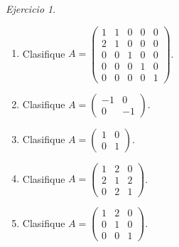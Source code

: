 \documentclass[12pt]{article}
\theoremstyle{remark}
\newtheorem{Ejer}[definicion]{Ejercicio}
\begin{document}
\begin{Ejer}
\begin{enumerate}[resume=banco]
\item Clasifique $A=\begin{pmatrix}1&1&0&0&0\\2&1&0&0&0\\0&0&1&0&0\\0&0&0&1&0\\0&0&0&0&1\end{pmatrix}$.

\item Clasifique $A=\begin{pmatrix}-1&0\\0&-1\end{pmatrix}$.

\item Clasifique $A=\begin{pmatrix}1&0\\0&1\end{pmatrix}$.

\item Clasifique $A=\begin{pmatrix}1&2&0\\2&1&2\\0&2&1\end{pmatrix}$.

\item Clasifique $A=\begin{pmatrix}1&2&0\\0&1&0\\0&0&1\end{pmatrix}$.

\end{enumerate}
\end{Ejer}
\end{document}
